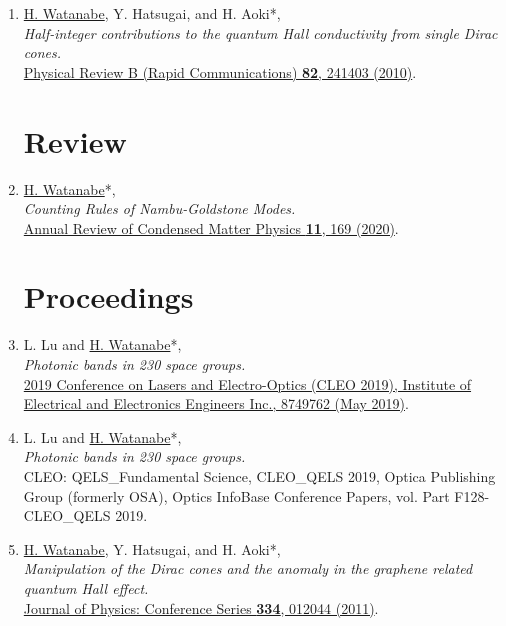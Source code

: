 \documentclass[letterpaper,11pt]{article}
\begin{document}
\begin{enumerate}
\item \underline{H. Watanabe}, Y. Hatsugai, and H. Aoki*, \\\emph{Half-integer contributions to the quantum Hall conductivity from single Dirac cones.}\\{\href{https://doi.org/10.1103/PhysRevB.82.241403}{Physical Review B (Rapid Communications) {\bf 82}, 241403 (2010)}.}

\setcounter{enumi}{0}
\section*{Review}
\item \underline{H. Watanabe}*, \\\emph{Counting Rules of Nambu-Goldstone Modes.}\\
{\href{https://doi.org/10.1146/annurev-conmatphys-031119-050644}{Annual Review of Condensed Matter Physics {\bf 11}, 169 (2020)}.}

\setcounter{enumi}{0}
\section*{Proceedings}

\item L. Lu and \underline{H. Watanabe}*, \\\emph{Photonic bands in 230 space groups.}\\{\href{https://doi.org/10.1109/CLEO.2019.8749762}{2019 Conference on Lasers and Electro-Optics (CLEO 2019), Institute of Electrical and Electronics Engineers Inc., 8749762 (May 2019)}.}

\item L. Lu and \underline{H. Watanabe}*, \\\emph{Photonic bands in 230 space groups.}\\{CLEO: QELS\_Fundamental Science, CLEO\_QELS 2019, Optica Publishing Group (formerly OSA), Optics InfoBase Conference Papers, vol. Part F128-CLEO\_QELS 2019.}

\item \underline{H. Watanabe}, Y. Hatsugai, and H. Aoki*, \\\emph{Manipulation of the Dirac cones and the anomaly in the graphene related quantum Hall effect.}\\{\href{https://doi.org/10.1088/1742-6596/334/1/012044}{Journal of Physics: Conference Series {\bf 334}, 012044 (2011)}.}



\setcounter{enumi}{0}

\end{enumerate}
\end{document}
